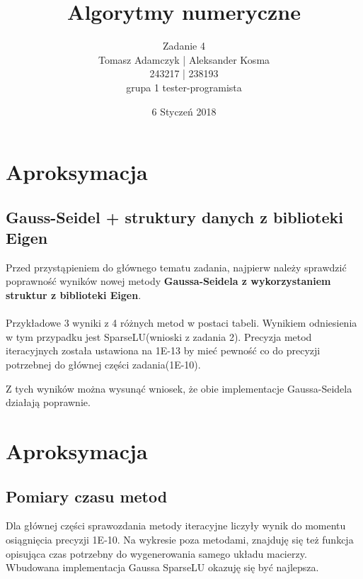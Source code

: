 \documentclass[8pt]{article}
\title{Algorytmy numeryczne}
\author{Zadanie 4 \\ Tomasz Adamczyk | Aleksander Kosma\\243217 | 238193\\grupa 1 tester-programista}
\date{6 Styczeń 2018}
\begin{document}
\maketitle 

\section*{Aproksymacja}

\subsection*{Gauss-Seidel + struktury danych z biblioteki Eigen}
Przed przystąpieniem do głównego tematu zadania, najpierw należy sprawdzić poprawność wyników nowej metody \textbf{Gaussa-Seidela z wykorzystaniem struktur z biblioteki Eigen}.\\
\\
Przykładowe 3 wyniki z 4 różnych metod w postaci tabeli. Wynikiem odniesienia w tym przypadku jest SparseLU(wnioski z zadania 2). Precyzja metod iteracyjnych została ustawiona na 1E-13 by mieć pewność co do precyzji potrzebnej do głównej części zadania(1E-10).
\begin{center}
\end{center}
Z tych wyników można wysunąć wniosek, że obie implementacje Gaussa-Seidela działają poprawnie.

\section*{Aproksymacja}
\subsection*{Pomiary czasu metod}
Dla głównej części sprawozdania metody iteracyjne liczyły wynik do momentu osiągnięcia precyzji 1E-10. Na wykresie poza metodami, znajduję się też funkcja opisująca czas potrzebny do wygenerowania samego układu macierzy. Wbudowana implementacja Gaussa SparseLU okazuję się być najlepsza.
\end{document}
